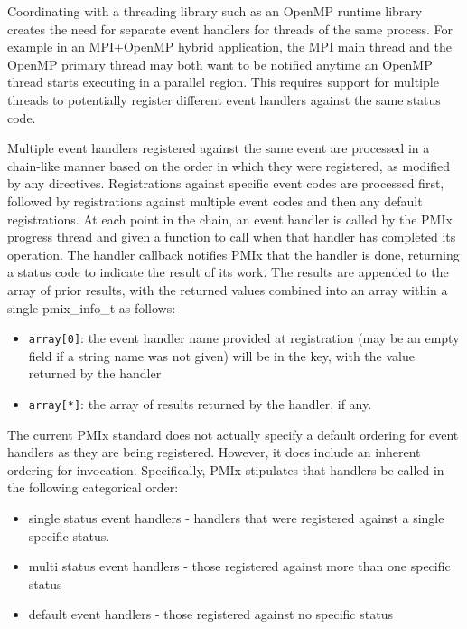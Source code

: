 Coordinating with a threading library such as an OpenMP runtime library creates the need for separate event handlers for threads of the same process.  For example in an MPI+OpenMP hybrid application, the MPI main thread and the OpenMP primary thread may both want to be notified anytime an OpenMP thread starts executing in a parallel region.  This requires support for multiple threads to potentially register different event handlers against the same status code.

Multiple event handlers registered against the same event are processed in a chain-like manner based on the order in which they were registered, as modified by any directives. Registrations against specific event codes are processed first, followed by registrations against multiple event codes and then any default registrations. At each point in the chain, an event handler is called by the PMIx progress thread and given a function to call when that handler has completed its operation. The handler callback notifies PMIx that the handler is done, returning a status code to indicate the result of its work. The results are appended to the array of prior results, with the returned values combined into an array within a single pmix_info_t as follows:
\begin{itemize}
\item \texttt{array[0]}: the event handler name provided at registration (may be an empty field if a string name was not given) will be in the key, with the  value returned by the handler
\item \texttt{array[*]}: the array of results returned by the handler, if any.
\end{itemize}

The current PMIx standard does not actually specify a default ordering for event handlers as they are being registered. However, it does include an inherent ordering for invocation. Specifically, PMIx stipulates that handlers be called in the following categorical order:

\begin{itemize}
\item single status event handlers - handlers that were registered against a single specific status.
\item multi status event handlers - those registered against more than one specific status
\item default event handlers - those registered against no specific status
\end{itemize}

